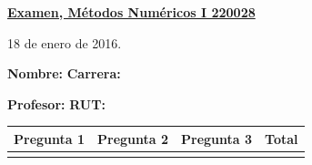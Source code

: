\documentclass[11pt]{article}
\begin{document}
\hspace*{-1,5cm}

\vspace*{0.5cm} \centerline {\bf\underline{Examen, M\'etodos Num\'ericos I 220028 }}
\centerline{\textrm{18 de enero de 2016.}}  \vspace{0.2cm}


\textbf{Nombre:} \hspace{0.5\textwidth}\textbf{Carrera:}

\vspace{0.1cm}
\textbf{Profesor:}\hspace{0.5\textwidth} \textbf{ RUT:}

\begin{center}
 \begin{tabular}{||p{2cm}|p{2cm}|p{2cm}|p{2cm}||}
 \hline
 Pregunta 1 &  Pregunta 2 &     Pregunta 3  &Total\\
 \hline

  \vspace{1.5cm} & &    &   \\
 \hline
 \end{tabular}
 \end{center}
\end{document}
